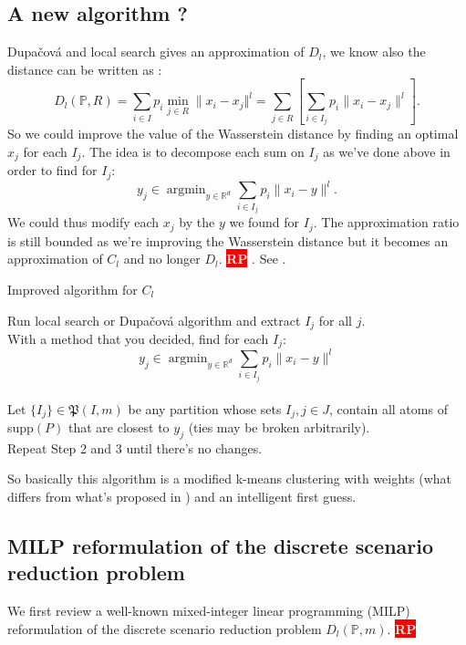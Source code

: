 \documentclass{amsart}
\newcommand{\argmin}{\mathop{\arg\min}}
\newcommand{\nb}[3]{
		{\colorbox{#2}{\bfseries\sffamily\tiny\textcolor{white}{#1}}}
		{\textcolor{#2}{\text{$\blacktriangleright$}{\textcolor{#2}{#3}}\text{$\blacktriangleleft$}}}}
\newcommand{\rp}[1]{\nb{RP}{red}{#1}}
\newcommand{\RR}{\mathbb{R}}
\begin{document}
\subsection{A new algorithm ?}
Dupačová and local search gives an approximation of $D_l$, we know also the distance can be written as :
$$D_l\left(\mathbb{P},R\right)=\sum_{i\in I}p_i\min_{j\in R}\lVert x_i-x_j\Vert^l=\sum_{j\in R}\left[\sum_{i\in I_j}p_i\lVert x_i-x_j\rVert^l\right].$$
So we could improve the value of the Wasserstein distance by finding an optimal $x_j$ for each $I_j$. The idea is to decompose each sum on $I_j$ as we've done above in order to find for $I_j$: 
$$
y_j\in \argmin_{y\in\RR^d}\sum_{i\in I_j}p_i\lVert x_i-y\rVert^l.
$$
We could thus modify each $x_j$ by the $y$ we found for $I_j$. The approximation ratio is still bounded as we're improving the Wasserstein distance but it becomes an approximation of $C_l$ and no longer $D_l$. \rp{idea to improve }. See .

\begin{algorithm}[h]\caption{Improved algorithm for $C_l$}
    \label{improved ls}
    Run local search or Dupačová algorithm and extract $I_j$ for all $j$. \\
    With a method that you decided, find for each $I_j$: $$y_j\in\argmin_{y\in\RR^d}\sum_{i\in I_j}p_i\lVert x_i-y\rVert^l$$
    \\ Let $\{I_j\}\in\mathfrak{P}\left(I,m\right)$ be any partition whose sets $I_j, j\in J$, contain all atoms of supp$\left(P\right)$ that are closest to $y_j$ (ties may be broken arbitrarily). \\
    Repeat Step 2 and 3 until there's no changes.
\end{algorithm}

So basically this algorithm is a  modified k-means clustering with weights (what differs from what's proposed in \cite{rujeerapaiboon_scenario_2022}) and an intelligent first guess.
\subsection{MILP reformulation of the discrete scenario reduction problem}
We first review a well-known mixed-integer linear programming (MILP) reformulation of the discrete scenario reduction problem $D_l\left(\mathbb{P},m\right)$.\rp{find a reference}
\end{document}
